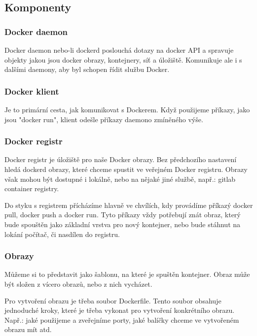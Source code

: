 \documentclass[thesis=B,czech]{FITthesis}[2019/12/23]
\begin{document}
\subsection{Komponenty}

\subsubsection{Docker daemon}

Docker daemon nebo-li dockerd poslouchá dotazy na docker API a spravuje objekty jakou jsou docker obrazy, kontejnery, síť a úložiště. Komunikuje ale i s dalšími daemony, aby byl schopen řídit službu Docker.

\subsubsection{Docker klient}

Je to primární cesta, jak komunikovat s Dockerem. Když použijeme příkazy, jako jsou "docker run", klient odešle příkazy daemono zmíněného výše. 

\subsubsection{Docker registr}

Docker registr je úložiště pro naše Docker obrazy. Bez předchozího nastavení hledá dockerd obrazy, které chceme spustit ve veřejném Docker registru. Obrazy však mohou být dostupné i lokálně, nebo na nějaké jiné službě, např.: gitlab container registry. 

Do styku s registrem přícházíme hlavně ve chvílích, kdy provádíme příkazý docker pull, docker push a docker run. Tyto příkazy vždy potřebují znát obraz, který bude spouštěn jako základní vrstva pro nový kontejner, nebo bude stáhnut na lokání počítač, či nasdílen do registru.

\subsubsection{Obrazy}

Můžeme si to představit jako šablonu, na které je spuštěn kontejner. Obraz může být složen z vícero obrazů, nebo z nich vycházet. 

Pro vytvoření obrazu je třeba soubor Dockerfile. Tento soubor obsahuje jednoduché kroky, které je třeba vykonat pro vytvoření konkrétního obrazu. Např.: jaké použijeme a zveřejníme porty, jaké balíčky chceme ve vytvořeném obrazu mít atd. 
\end{document}
